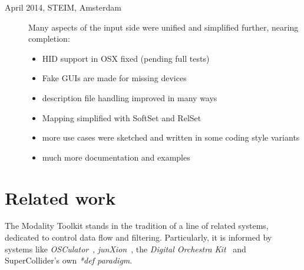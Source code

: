 \documentclass{article}
\begin{document}
\begin{description}
	\item[April 2014, STEIM, Amsterdam] 	Many aspects of the input side were unified and simplified further, nearing completion:
	\begin{itemize} 
		\item HID support in OSX fixed (pending full tests)
		\item Fake GUIs are made for missing devices
		\item description file handling improved in many ways
		\item Mapping simplified with SoftSet and RelSet
		\item more use cases were sketched and written in some coding style variants
		\item much more documentation and examples
	\end{itemize}
\end{description}



\section{Related work}
\label{sec:related_work}

The Modality Toolkit stands in the tradition of a line of related systems, dedicated to control data flow and filtering.
Particularly, it is informed by systems like \emph{OSCulator}~\cite{troillard2012-osc}, \emph{junXion}~\cite{-jun}, the \emph{Digital Orchestra Kit}~\cite{malloch2008-a-n} and SuperCollider's own \emph{*def paradigm}.
\end{document}
